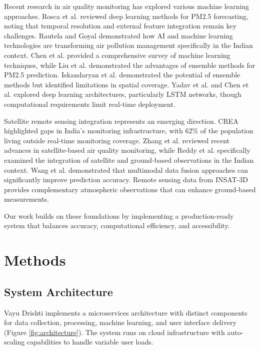 \documentclass[12pt]{article}
\begin{document}
Recent research in air quality monitoring has explored various machine learning approaches. Rosca et al. \citep{rosca2025datadriven} reviewed deep learning methods for PM2.5 forecasting, noting that temporal resolution and external feature integration remain key challenges. Rautela and Goyal \citep{rautela2024ai} demonstrated how AI and machine learning technologies are transforming air pollution management specifically in the Indian context. Chen et al. \citep{chen2024machine} provided a comprehensive survey of machine learning techniques, while Liu et al. \citep{liu2024ensemble} demonstrated the advantages of ensemble methods for PM2.5 prediction. Iskandaryan et al. \citep{iskandaryan2020smart} demonstrated the potential of ensemble methods but identified limitations in spatial coverage. Yadav et al. \citep{yadav2021deepaq} and Chen et al. \citep{chen2024lstm} explored deep learning architectures, particularly LSTM networks, though computational requirements limit real-time deployment.

Satellite remote sensing integration represents an emerging direction. CREA \citep{crea2024tracing} highlighted gaps in India's monitoring infrastructure, with 62\% of the population living outside real-time monitoring coverage. Zhang et al. \citep{zhang2024satellite} reviewed recent advances in satellite-based air quality monitoring, while Reddy et al. \citep{reddy2024satellite} specifically examined the integration of satellite and ground-based observations in the Indian context. Wang et al. \citep{wang2024multimodal} demonstrated that multimodal data fusion approaches can significantly improve prediction accuracy. Remote sensing data from INSAT-3D provides complementary atmospheric observations that can enhance ground-based measurements.

Our work builds on these foundations by implementing a production-ready system that balances accuracy, computational efficiency, and accessibility.

\section{Methods}

\subsection{System Architecture}

Vayu Drishti implements a microservices architecture with distinct components for data collection, processing, machine learning, and user interface delivery (Figure \ref{fig:architecture}). The system runs on cloud infrastructure with auto-scaling capabilities to handle variable user loads.
\end{document}
